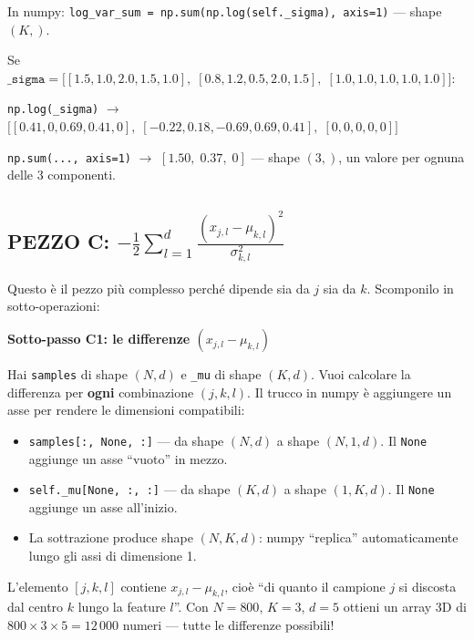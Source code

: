 \documentclass[11pt,a4paper]{article}
\begin{document}
In numpy: \texttt{log\_var\_sum = np.sum(np.log(self.\_sigma), axis=1)} --- shape $(K,)$.

\begin{exbox}[Esempio con $K=3$, $d=5$]
Se $\texttt{\_sigma} = \bigl[\![1.5, 1.0, 2.0, 1.5, 1.0],\; [0.8, 1.2, 0.5, 2.0, 1.5],\; [1.0, 1.0, 1.0, 1.0, 1.0]\!\bigr]$:

\texttt{np.log(\_sigma)} $\to$ $\bigl[\![0.41, 0, 0.69, 0.41, 0],\; [-0.22, 0.18, -0.69, 0.69, 0.41],\; [0, 0, 0, 0, 0]\!\bigr]$

\texttt{np.sum(..., axis=1)} $\to$ $[1.50,\; 0.37,\; 0]$ --- shape $(3,)$, un valore per ognuna delle 3 componenti.
\end{exbox}

\subsection{PEZZO C: $-\frac{1}{2}\sum_{l=1}^{d}\frac{(x_{j,l} - \mu_{k,l})^2}{\sigma_{k,l}^2}$}

Questo \`e il pezzo pi\`u complesso perch\'e dipende sia da $j$ sia da $k$. Scomponilo in sotto-operazioni:

\bigskip
\textbf{Sotto-passo C1: le differenze $(x_{j,l} - \mu_{k,l})$}

Hai \texttt{samples} di shape $(N, d)$ e \texttt{\_mu} di shape $(K, d)$. Vuoi calcolare la differenza per \textbf{ogni} combinazione $(j, k, l)$. Il trucco in numpy \`e aggiungere un asse per rendere le dimensioni compatibili:

\begin{itemize}
    \item \texttt{samples[:, None, :]} --- da shape $(N, d)$ a shape $(N, 1, d)$. Il \texttt{None} aggiunge un asse ``vuoto'' in mezzo.
    \item \texttt{self.\_mu[None, :, :]} --- da shape $(K, d)$ a shape $(1, K, d)$. Il \texttt{None} aggiunge un asse all'inizio.
    \item La sottrazione produce shape $(N, K, d)$: numpy ``replica'' automaticamente lungo gli assi di dimensione 1.
\end{itemize}

\begin{exbox}
L'elemento $[j, k, l]$ contiene $x_{j,l} - \mu_{k,l}$, cio\`e ``di quanto il campione $j$ si discosta dal centro $k$ lungo la feature $l$''. Con $N=800$, $K=3$, $d=5$ ottieni un array 3D di $800 \times 3 \times 5 = 12\,000$ numeri --- tutte le differenze possibili!
\end{exbox}
\end{document}
